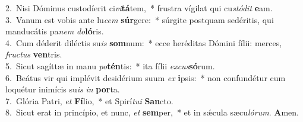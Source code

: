 {2.~}Nisi Dóminus custodíerit ci\textit{vi}\textbf{tá}tem,~* frustra vígilat qui cu\textit{stó}\textit{dit} \textbf{e}am.\\
{3.~}Vanum est vobis ante lu\textit{cem} \textbf{súr}gere:~* súrgite postquam sedéritis, qui manducátis pa\textit{nem} \textit{do}\textbf{ló}ris.\\
{4.~}Cum déderit diléctis su\textit{is} \textbf{som}num:~* ecce heréditas Dómini fílii: merces, \textit{fru}\textit{ctus} \textbf{ven}tris.\\
{5.~}Sicut sagíttæ in manu \textit{po}\textbf{tén}tis:~* ita fílii \textit{ex}\textit{cus}\textbf{só}rum.\\
{6.~}Beátus vir qui implévit desidérium suum \textit{ex} \textbf{i}psis:~* non confundétur cum loquétur inimícis su\textit{is} \textit{in} \textbf{por}ta.\\
{7.~}Glória Patri, \textit{et} \textbf{Fí}lio,~* et Spirí\textit{tu}\textit{i} \textbf{San}cto.\\
{8.~}Sicut erat in princípio, et nunc, \textit{et} \textbf{sem}per,~* et in sǽcula sæcu\textit{ló}\textit{rum}. \textbf{A}men.\\
